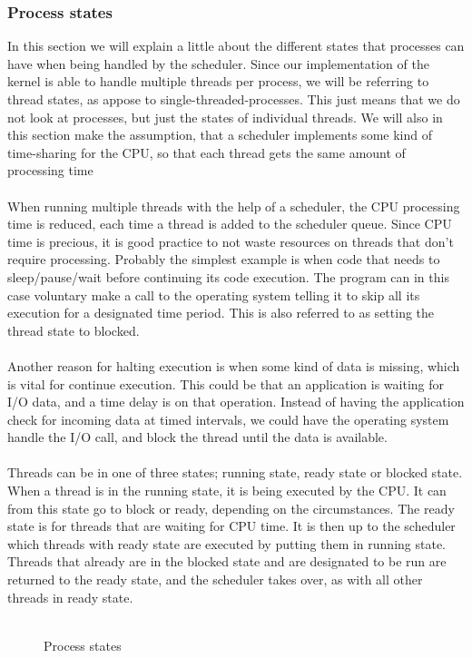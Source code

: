 \subsubsection{Process states}
In this section we will explain a little about the different states that processes can have when being handled by the scheduler. Since our implementation of the kernel is able to handle multiple threads per process, we will be referring to thread states, as appose to single-threaded-processes. This just means that we do not look at processes, but just the states of individual threads. We will also in this section make the assumption, that a scheduler implements some kind of time-sharing for the CPU, so that each thread gets the same amount of processing time
\\
\\
When running multiple threads with the help of a scheduler, the CPU processing time is reduced, each time a thread is added to the scheduler queue. Since CPU time is precious, it is good practice to not waste resources on threads that don't require processing. Probably the simplest example is when code that needs to sleep/pause/wait before continuing its code execution. The program can in this case voluntary make a call to the operating system telling it to skip all its execution for a designated time period. This is also referred to as setting the thread state to blocked.
\\
\\
Another reason for halting execution is when some kind of data is missing, which is vital for continue execution. This could be that an application is waiting for I/O data, and a time delay is on that operation. Instead of having the application check for incoming data at timed intervals, we could have the operating system handle the I/O call, and block the thread until the data is available.
\\
\\
Threads can be in one of three states; running state, ready state or blocked state.
When a thread is in the running state, it is being executed by the CPU. It can from this state go to block or ready, depending on the circumstances. The ready state is for threads that are waiting for CPU time. It is then up to the scheduler which threads with ready state are executed by putting them in running state. Threads that already are in the blocked state and are designated to be run are returned to the ready state, and the scheduler takes over, as with all other threads in ready state.
\\
\\
\begin{figure}
\centering
{}
\caption{Process states}
\label{fig:process_states}
\end{figure}

